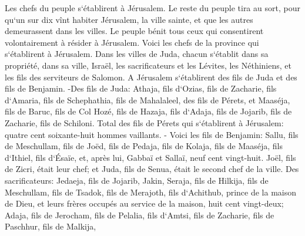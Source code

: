\verse Les chefs du peuple s`établirent à Jérusalem. Le reste du peuple tira au sort, pour qu`un sur dix vînt habiter Jérusalem, la ville sainte, et que les autres demeurassent dans les villes. 
\verse Le peuple bénit tous ceux qui consentirent volontairement à résider à Jérusalem. 
\verse Voici les chefs de la province qui s`établirent à Jérusalem. Dans les villes de Juda, chacun s`établit dans sa propriété, dans sa ville, Israël, les sacrificateurs et les Lévites, les Néthiniens, et les fils des serviteurs de Salomon. 
\verse A Jérusalem s`établirent des fils de Juda et des fils de Benjamin. -Des fils de Juda: Athaja, fils d`Ozias, fils de Zacharie, fils d`Amaria, fils de Schephathia, fils de Mahalaleel, des fils de Pérets, 
\verse et Maaséja, fils de Baruc, fils de Col Hozé, fils de Hazaja, fils d`Adaja, fils de Jojarib, fils de Zacharie, fils de Schiloni. 
\verse Total des fils de Pérets qui s`établirent à Jérusalem: quatre cent soixante-huit hommes vaillants. - 
\verse Voici les fils de Benjamin: Sallu, fils de Meschullam, fils de Joëd, fils de Pedaja, fils de Kolaja, fils de Maaséja, fils d`Ithiel, fils d`Ésaïe, 
\verse et, après lui, Gabbaï et Sallaï, neuf cent vingt-huit. 
\verse Joël, fils de Zicri, était leur chef; et Juda, fils de Senua, était le second chef de la ville. 
\verse Des sacrificateurs: Jedaeja, fils de Jojarib, Jakin, 
\verse Seraja, fils de Hilkija, fils de Meschullam, fils de Tsadok, fils de Merajoth, fils d`Achithub, prince de la maison de Dieu, 
\verse et leurs frères occupés au service de la maison, huit cent vingt-deux; Adaja, fils de Jerocham, fils de Pelalia, fils d`Amtsi, fils de Zacharie, fils de Paschhur, fils de Malkija, 
